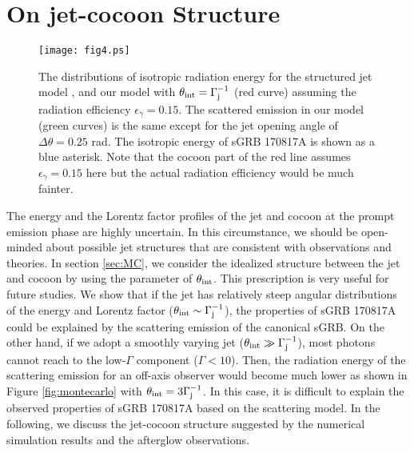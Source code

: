 \documentclass{emulateapj}
\begin{document}
\section{On jet-cocoon Structure}
\label{sec:jet-cocoon}

\begin{figure}
 \begin{center}
  \texttt{[image: fig4.ps]}
  \caption{The distributions of isotropic radiation energy for the structured jet model
    \citep[black curve;][]{2018arXiv180502870A,2018ApJ...856L..18M,2018arXiv180409345X}, 
    and our model with $\theta_{\rm int}=\Gamma_{\rm j}^{-1}$ (red curve)
    assuming the radiation efficiency $\epsilon_{\gamma}=0.15$.
    The scattered emission in our model (green curves) is the same except for the jet opening angle of $\Delta\theta=0.25$ rad.
    The isotropic energy of sGRB 170817A is shown as a blue asterisk. 
    Note that the cocoon part of the red line assumes $\epsilon_{\gamma}=0.15$ here but the actual radiation 
    efficiency would be much fainter.
  }
  \label{fig:distribution}
 \end{center}
\end{figure}

The energy and the Lorentz factor profiles of the jet and cocoon at the prompt emission phase are highly uncertain. 
In this circumstance, we should be open-minded about possible jet structures that are consistent with observations and theories. 
In section \ref{sec:MC}, we consider the idealized structure between the jet and cocoon by using the parameter of $\theta_{\rm int}$. 
This prescription is very useful for future studies. 
We show that if the jet has relatively steep angular distributions of the energy and Lorentz factor ($\theta_{\rm int}\sim\Gamma_{\rm j}^{-1}$),
the properties of sGRB 170817A could be explained by the scattering emission of the canonical sGRB.
On the other hand, if we adopt a smoothly varying jet ($\theta_{\rm int}\gg\Gamma_{\rm j}^{-1}$),
most photons cannot reach to the low-$\Gamma$ component ($\Gamma<10$). 
Then, the radiation energy of the scattering emission for an off-axis observer would become much lower as shown in Figure \ref{fig:montecarlo}
with $\theta_{\rm int}=3\Gamma_{\rm j}^{-1}$. 
In this case, it is difficult to explain the observed properties of sGRB 170817A based on the scattering model.
In the following, we discuss the jet-cocoon structure suggested by the numerical simulation results and the afterglow observations. 
\end{document}
